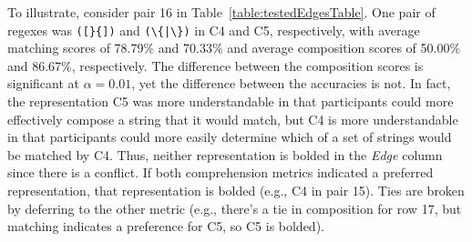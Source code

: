 
To illustrate, consider pair 16 in Table~\ref{table:testedEdgesTable}.
One pair of regexes was \verb!([}{])! and \verb!(\{|\})! in C4 and C5, respectively, with average matching scores of 78.79\% and 70.33\% and average composition scores of 50.00\% and 86.67\%, respectively.
The difference between the composition scores is significant at $\alpha = 0.01$, yet the difference between the accuracies is not.
In fact, the representation C5 was more understandable in that participants could more effectively compose a string that it would match, but C4 is more understandable in that participants could more easily determine which of a set of strings would be matched by C4. Thus, neither representation is bolded in the \emph{Edge} column since there is a conflict.
If both comprehension metrics indicated a preferred representation, that representation is bolded (e.g., C4 in pair 15). Ties are broken by deferring to the other metric (e.g., there's a tie in composition for row 17, but matching indicates a preference for C5, so C5 is bolded).


%

